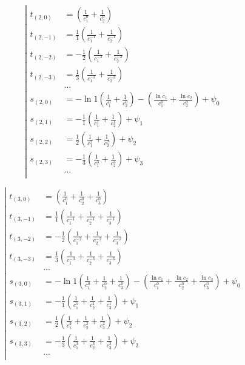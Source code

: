 \begin{equation*} \left| \begin{aligned}
t_{(2,0)} &=
  \left(
  \frac{1}{c_1^0}
+ \frac{1}{c_2^0} \right) \\
%
t_{(2,-1)} &=
  \frac{1}{1} \left(
  \frac{1}{c_1^{-1}}
+ \frac{1}{c_2^{-1}} \right) \\
%
t_{(2,-2)} &=
- \frac{1}{2} \left(
  \frac{1}{c_1^{-2}}
+ \frac{1}{c_2^{-2}} \right) \\
%
t_{(2,-3)} &=
  \frac{1}{3} \left(
  \frac{1}{c_1^{-3}}
+ \frac{1}{c_2^{-3}} \right) \\
%
&\ldots \\
%
s_{(2,0)} &=
- \ln{1} \left(
  \frac{1}{c_1^0}
+ \frac{1}{c_2^0} \right)
- \left(
  \frac{\ln{c_1}}{c_1^0}
+ \frac{\ln{c_2}}{c_2^0} \right)
+ \psi_0 \\
%
s_{(2,1)} &=
- \frac{1}{1} \left(
  \frac{1}{c_1^1}
+ \frac{1}{c_2^1} \right)
+ \psi_1 \\
%
s_{(2,2)} &=
  \frac{1}{2} \left(
  \frac{1}{c_1^2}
+ \frac{1}{c_2^2} \right)
+ \psi_2 \\
%
s_{(2,3)} &=
- \frac{1}{3} \left(
  \frac{1}{c_1^3}
+ \frac{1}{c_2^3} \right)
+ \psi_3 \\
%
&\ldots \\
\end{aligned} \right. \end{equation*}

\begin{equation*} \left| \begin{aligned}
t_{(3,0)} &=
  \left(
  \frac{1}{c_1^0}
+ \frac{1}{c_2^0}
+ \frac{1}{c_3^0} \right) \\
%
t_{(3,-1)} &=
  \frac{1}{1} \left(
  \frac{1}{c_1^{-1}}
+ \frac{1}{c_2^{-1}}
+ \frac{1}{c_3^{-1}} \right) \\
%
t_{(3,-2)} &=
- \frac{1}{2} \left(
  \frac{1}{c_1^{-2}}
+ \frac{1}{c_2^{-2}}
+ \frac{1}{c_3^{-2}} \right) \\
%
t_{(3,-3)} &=
  \frac{1}{3} \left(
  \frac{1}{c_1^{-3}}
+ \frac{1}{c_2^{-3}}
+ \frac{1}{c_3^{-3}} \right) \\
%
&\ldots \\
%
s_{(3,0)} &=
- \ln{1} \left(
  \frac{1}{c_1^0}
+ \frac{1}{c_2^0}
+ \frac{1}{c_3^0} \right)
- \left(
  \frac{\ln{c_1}}{c_1^0}
+ \frac{\ln{c_2}}{c_2^0}
+ \frac{\ln{c_3}}{c_3^0} \right)
+ \psi_0 \\
%
s_{(3,1)} &=
- \frac{1}{1} \left(
  \frac{1}{c_1^1}
+ \frac{1}{c_2^1}
+ \frac{1}{c_3^1} \right)
+ \psi_1 \\
%
s_{(3,2)} &=
  \frac{1}{2} \left(
  \frac{1}{c_1^2}
+ \frac{1}{c_2^2}
+ \frac{1}{c_3^2} \right)
+ \psi_2 \\
%
s_{(3,3)} &=
- \frac{1}{3} \left(
  \frac{1}{c_1^3}
+ \frac{1}{c_2^3}
+ \frac{1}{c_3^3} \right)
+ \psi_3 \\
%
&\ldots \\
\end{aligned} \right. \end{equation*}

